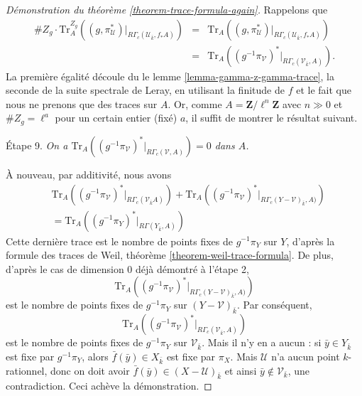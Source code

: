 \begin{proof}[Démonstration du théorème \ref{theorem-trace-formula-again}]
\medskip\noindent
Rappelons que
\begin{eqnarray*}
\# Z_g \cdot \text{Tr}_A^{Z_g}((g, \pi_\mathcal{U}^*)
|_{R\Gamma_c(\mathcal{U}_{\bar k}, f_*A)})
& = & \text{Tr}_A((g, \pi_\mathcal{U}^*)
|_{R\Gamma_c(\mathcal{U}_{\bar k}, f_*A)})\\
& = &
\text{Tr}_A((g^{-1}\pi_\mathcal{V})^* |_{R\Gamma_c(\mathcal{V}_{\bar k}, A)}).
\end{eqnarray*}
La première égalité découle du
le lemme \ref{lemma-gamma-z-gamma-trace},
la seconde de la suite spectrale de Leray,
en utilisant la finitude de $f$ et le fait que nous ne prenons que
des traces sur $A$. Or, comme $A=\mathbf{Z}/\ell^n\mathbf{Z}$ avec
$n \gg 0$ et $\# Z_g = \ell^a$ pour un certain entier (fixé) $a$,
il suffit de montrer le résultat suivant.

\medskip\noindent
Étape 9. {\it On a
$\text{Tr}_A((g^{-1}\pi_\mathcal{V})^* |_{R\Gamma_c(\mathcal{V}, A)}) = 0$
dans $A$.}

\medskip\noindent
À nouveau, par additivité, nous avons
\begin{eqnarray*}
& \text{Tr}_A((g^{-1}\pi_\mathcal{V})^* |_{R\Gamma_c(\mathcal{V}_{\bar k} A)})
+
\text{Tr}_A((g^{-1}\pi_\mathcal{V})^*
|_{R\Gamma_c(Y-\mathcal {V})_{\bar k}, A)}) \\
& =
\text{Tr}_A((g^{-1}\pi_Y)^* |_{R\Gamma(Y_{\bar k}, A)})
\end{eqnarray*}
Cette dernière trace est le nombre de points fixes de $g^{-1}\pi_Y$ sur $Y$, d'après
la formule des traces de Weil,
théorème \ref{theorem-weil-trace-formula}.
De plus, d'après le cas de dimension 0 déjà démontré à l'étape 2,
$$
\text{Tr}_A((g^{-1}\pi_\mathcal{V})^*|_{R\Gamma_c(Y-\mathcal{V})_{\bar k}, A)})
$$
est le nombre de points fixes de $g^{-1}\pi_Y$ sur $(Y-\mathcal{V})_{\bar k}$.
Par conséquent,
$$
\text{Tr}_A((g^{-1}\pi_\mathcal{V})^* |_{R\Gamma_c(\mathcal{V}_{\bar k}, A)})
$$
est le nombre de points fixes de $g^{-1}\pi_Y$ sur $\mathcal{V}_{\bar k}$. Mais
il n'y en a aucun : si $\bar y\in Y_{\bar k}$ est fixe par
$g^{-1}\pi_Y$, alors $\bar f(\bar y) \in X_{\bar k}$ est fixe par $\pi_X$. Mais
$\mathcal{U}$ n'a aucun point $k$-rationnel, donc on doit avoir $\bar f(\bar y)\in
(X-\mathcal{U})_{\bar k}$ et ainsi $\bar y\notin \mathcal{V}_{\bar k}$, une
contradiction.
Ceci achève la démonstration.
\end{proof}

